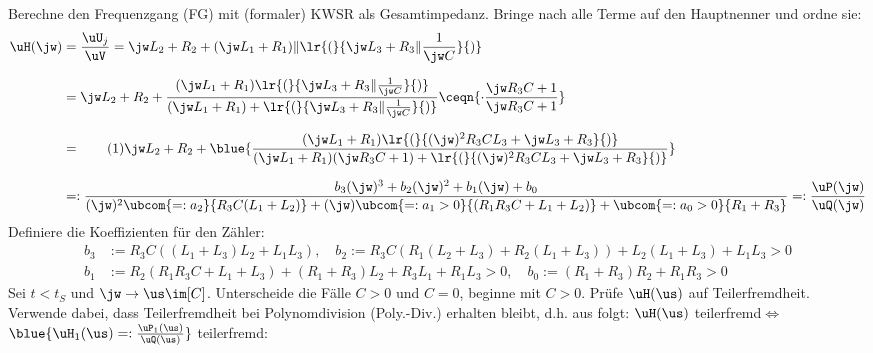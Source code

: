 %
\newcommand{\defaultPath}{/docs/LaTeX_Def/}




%

\allowdisplaybreaks
\reversemarginpar
\newcommand{\numberthis}[1]{%
	\stepcounter{equation}\tag{\theequation}\label{#1}%
}%

%
%
%
\noindent Berechne den Frequenzgang (FG) mit (formaler) KWSR als Gesamtimpedanz. Bringe nach  alle Terme auf den Hauptnenner und ordne sie:
\begin{align*}%
	\uH(\jw)&=\frac{\uU_j}{\uV}=\jw L_2+R_2+(\jw L_1+R_1)\|\lr{(}{%
		\jw L_3+R_3\|\frac{1}{\jw C}%
	}{)}\\[2.5mm]%
%
	&=\jw L_2+R_2+\frac{%
		(\jw L_1+R_1)\lr{(}{%
			\jw L_3+R_3\|\frac{1}{\jw C}%
		}{)}
	}{%
		(\jw L_1+R_1)+\lr{(}{%
			\jw L_3+R_3\|\frac{1}{\jw C}%
		}{)}%
	}\ceqn{%
		\cdot\frac{\jw R_3C+1}{\jw R_3C+1}%
	}\\[2.5mm]%
%
	&=\numberthis{a1a_FG_Poly1}\jw L_2+R_2+\blue{\frac{%
		(\jw L_1+R_1)\lr{(}{%
			(\jw)^2R_3CL_3+\jw L_3+R_3%
		}{)}%
	}{%
		(\jw L_1+R_1)(\jw R_3C+1)+\lr{(}{%
			(\jw)^2R_3CL_3+\jw L_3+R_3%
		}{)}%
	}}\\[2.5mm]%
%
	&=:\frac{%
		b_3(\jw)^3+b_2(\jw)^2+b_1(\jw)+b_0%
	}{%
		(\jw)^2\ubcom{=:a_2}{R_3C(L_1+L_2)}+(\jw)\ubcom{=:a_1>0}{(R_1R_3C+L_1+L_2)}+\ubcom{=:a_0>0}{R_1+R_3}%
	}=:\frac{\uP(\jw)}{\uQ(\jw)}%
\end{align*}
%
Definiere die Koeffizienten für den Zähler:
\begin{align*}
	b_3&:=R_3C((L_1+L_3)L_2+L_1L_3),\quad b_2:=R_3C(R_1(L_2+L_3)+R_2(L_1+L_3))+L_2(L_1+L_3)+L_1L_3>0\\[2.5mm]%
%
	b_1&:=R_2(R_1R_3C+L_1+L_3)+(R_1+R_3)L_2+R_3L_1+R_1L_3>0,\quad b_0:=(R_1+R_3)R_2+R_1R_3>0%
\end{align*}%
%
%
%
Sei $t<t_S$ und $\jw\rightarrow\us\im[C]$. Unterscheide die Fälle $C>0$ und $C=0$, beginne mit $C>0$. Prüfe $\uH(\us)$ auf Teilerfremdheit. Verwende dabei, dass Teilerfremdheit bei Polynomdivision (Poly.-Div.) erhalten bleibt, d.h. aus  folgt: \glqq$\uH(\us)$ teilerfremd\grqq $\Leftrightarrow$ \glqq$\blue{%
	\uH_1(\us)=:\frac{\uP_1(\us)}{\uQ(\us)}%
}$ teilerfremd\grqq:
